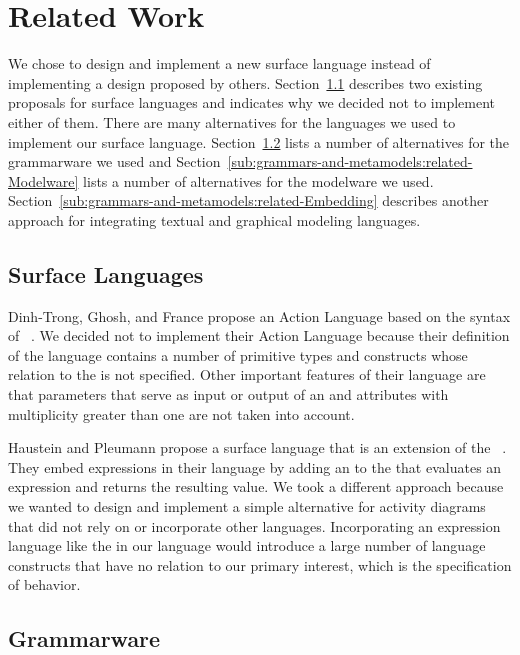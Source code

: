 \section{Related Work}
\label{sec:grammars-and-metamodels:Related-Work}

We chose to design and implement a new surface language instead of implementing a design proposed by others.
Section~\ref{sub:grammars-and-metamodels:Surface-languages} describes two existing proposals for surface languages and indicates why we decided not to implement either of them.
There are many alternatives for the languages we used to implement our surface language.
Section~\ref{sub:grammars-and-metamodels:Related-Grammarware} lists a number of alternatives for the grammarware we used and Section~\ref{sub:grammars-and-metamodels:related-Modelware} lists a number of alternatives for the modelware we used.
Section~\ref{sub:grammars-and-metamodels:related-Embedding} describes another approach for integrating textual and graphical modeling languages.


\subsection{Surface Languages}
\label{sub:grammars-and-metamodels:Surface-languages}

Dinh-Trong, Ghosh, and France propose an Action Language based on the syntax of \Java~\cite{JAL}.
We decided not to implement their Action Language because their definition of the language contains a number of primitive types and \Java constructs whose relation to the \UML is not specified.
Other important features of their language are that parameters that serve as input or output of an \Activity and attributes with multiplicity greater than one are not taken into account.

Haustein and Pleumann propose a surface language that is an extension of the \OCL~\cite{Haustein:2004:WRKUMLOMDE,OCLspec}.
They embed \OCL expressions in their language by adding an \Action to the \UML that evaluates an \OCL expression and returns the resulting value.
We took a different approach because we wanted to design and implement a simple alternative for activity diagrams that did not rely on or incorporate other languages.
Incorporating an expression language like the \OCL in our language would introduce a large number of language constructs that have no relation to our primary interest, which is the specification of behavior.


\subsection{Grammarware}
\label{sub:grammars-and-metamodels:Related-Grammarware}

